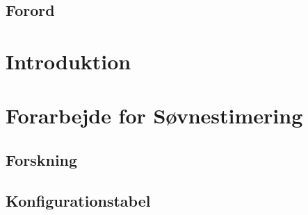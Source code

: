 %
%
%
%
% 



\pagestyle{empty} %
%
%

\newpage

\cleardoublepage

\section*{Forord}

\cleardoublepage

\renewcommand{\contentsname}{Indholdsfortegnelse}
\pagestyle{fancy} %
\setcounter{tocdepth}{1}
\tableofcontents
\listoftodos
%
\cleardoublepage

\chapter{Introduktion}


\chapter{Forarbejde for Søvnestimering}\label{chap:forarbejdsoevn}

\section{Forskning}

\section{Konfigurationstabel}

